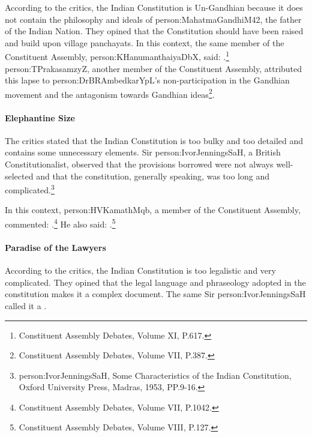 According to the critics, the Indian Constitution is Un-Gandhian because it does not contain the philosophy and ideals of \gls{person:MahatmaGandhiM42}, the father of the Indian Nation. They opined that the Constitution should have been raised and build upon village panchayats. In this context, the same member of the Constituent Assembly, \gls{person:KHanumanthaiyaDbX}, said: .\footnote{Constituent Assembly Debates, Volume XI, P.617.} \gls{person:TPrakasamzyZ}, another member of the Constituent Assembly, attributed this lapse to \gls{person:DrBRAmbedkarYpL}'s non-participation in the Gandhian movement and the antagonism towards Gandhian ideas\footnote{Constituent Assembly Debates, Volume VII, P.387.}.

\paragraph{Elephantine Size}

The critics stated that the Indian Constitution is too bulky and too detailed and contains some unnecessary elements. Sir \gls{person:IvorJenningsSaH}, a British Constitutionalist, observed that the provisions borrowed were not always well-selected and that the constitution, generally speaking, was too long and complicated.\footnote{\gls{person:IvorJenningsSaH}, Some Characteristics of the Indian Constitution, Oxford University Press, Madras, 1953, PP.9-16.}

In this context, \gls{person:HVKamathMqb}, a member of the Constituent Assembly, commented: .\footnote{Constituent Assembly Debates, Volume VII, P.1042.} He also said: .\footnote{Constituent Assembly Debates, Volume VIII, P.127.}

\paragraph{Paradise of the Lawyers}

According to the critics, the Indian Constitution is too legalistic and very complicated. They opined that the legal language and phraseology adopted in the constitution makes it a complex document. The same Sir \gls{person:IvorJenningsSaH} called it a .

